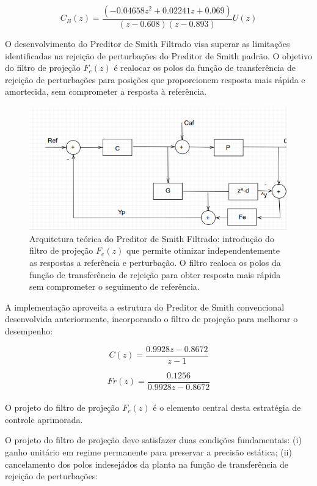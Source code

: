 \documentclass[a4paper,12pt]{article}
\begin{document}
\begin{equation}
C_{B}(z) =  \frac{(-0.04658z^2 + 0.02241z + 0.069)}{(z-0.608)(z-0.893)} U(z)
\end{equation}

O desenvolvimento do Preditor de Smith Filtrado visa superar as limitações identificadas na rejeição de perturbações do Preditor de Smith padrão. O objetivo do filtro de projeção $F_e(z)$ é realocar os polos da função de transferência de rejeição de perturbações para posições que proporcionem resposta mais rápida e amortecida, sem comprometer a resposta à referência.


\begin{figure} [h]
    \centering
    \includegraphics[width=0.8\linewidth]{image1.png}
    \caption{Arquitetura teórica do Preditor de Smith Filtrado: introdução do filtro de projeção $F_e(z)$ que permite otimizar independentemente as respostas a referência e perturbação. O filtro realoca os polos da função de transferência de rejeição para obter resposta mais rápida sem comprometer o seguimento de referência.}
    \label{fig:enter-label}
\end{figure}

A implementação aproveita a estrutura do Preditor de Smith convencional desenvolvida anteriormente, incorporando o filtro de projeção para melhorar o desempenho:

\begin{equation}
C(z) = \frac{0.9928z - 0.8672}{z - 1}
\end{equation}

\begin{equation}
Fr(z) = \frac{0.1256}{0.9928z - 0.8672}
\end{equation}\\

O projeto do filtro de projeção $F_e(z)$ é o elemento central desta estratégia de controle aprimorada.


O projeto do filtro de projeção deve satisfazer duas condições fundamentais: (i) ganho unitário em regime permanente para preservar a precisão estática; (ii) cancelamento dos polos indesejádos da planta na função de transferência de rejeição de perturbações:
\end{document}
